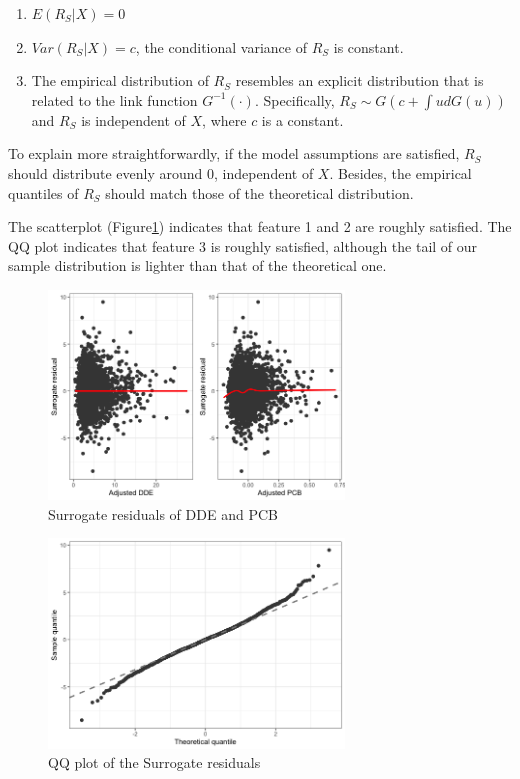 \documentclass[10pt]{jmlr}%
\begin{document}
\begin{enumerate}
	\item $E(R_S|X)=0$
	\item $Var(R_S|X)=c$, the conditional variance of $R_S$ is constant.
	\item The empirical distribution of $R_S$ resembles an explicit distribution that is related to the link function $G^{-1}(\cdot)$. Specifically, $R_S\sim G(c+\int ud G(u))$ and $R_S$ is independent of $X$, where $c$ is a constant.
\end{enumerate}

To explain more straightforwardly, if the model assumptions are satisfied, $R_S$ should distribute evenly around 0, independent of $X$. Besides, the empirical quantiles of $R_S$  should match those of the theoretical distribution.

The scatterplot (Figure\ref{fig:surrogateresid}) indicates that feature 1 and 2 are roughly satisfied. The QQ plot indicates that feature 3 is roughly satisfied, although the tail of our sample distribution is lighter than that of the theoretical one. 


\begin{figure}
	\centering
	\includegraphics[width=0.7\textwidth]{Surrogate_residuals.png}
	\caption{Surrogate residuals of DDE and PCB}
	\label{fig:surrogateresid}
\end{figure}

\begin{figure}
	\centering
	\includegraphics[width=0.7\textwidth]{qqplot.png}
	\caption{QQ plot of the Surrogate residuals}
	\label{fig:qqplot}
\end{figure}
\end{document}
